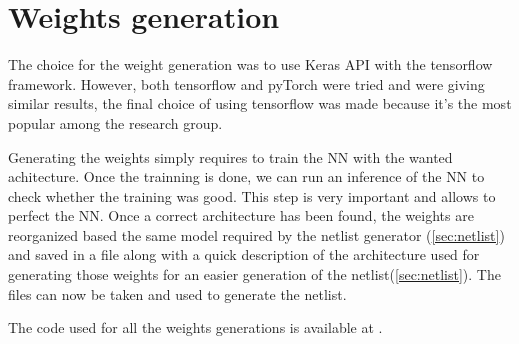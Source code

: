 \section{Weights generation}
\label{sec:weigen}

The choice for the weight generation was to use Keras API with the tensorflow framework. However, both tensorflow and pyTorch were tried and were giving similar results, the final choice of using tensorflow was made because it's the most popular among the research group.

Generating the weights simply requires to train the \ac{NN} with the wanted achitecture. Once the trainning is done, we can run an inference of the \ac{NN} to check whether the training was good. This step is very important and allows to perfect the \ac{NN}. Once a correct architecture has been found, the weights are reorganized based the same model required by the netlist generator (\cref{sec:netlist}) and saved in a file along with a quick description of the architecture used for generating those weights for an easier generation of the netlist(\cref{sec:netlist}). The files can now be taken and used to generate the netlist.

The code used for all the weights generations is available at \cite{lstmWei}.
